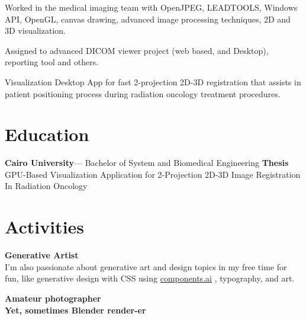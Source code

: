 \documentclass[]{deedy-resume-openfont}
\begin{document}
\begin{minipage}[t]{0.63\textwidth}
\subsectionsep{}
\begin{tightemize}
\item Worked in the medical imaging team with OpenJPEG, LEADTOOLS, Windows API, OpenGL, canvas drawing, advanced image processing techniques, 2D and 3D visualization.
\item Assigned to advanced DICOM viewer project (web based, and Desktop), reporting tool and others.
\end{tightemize}
\sectionsep
\vspace{4pt}

\subsectionsep{}
\begin{tightemize}
\item Visualization Desktop App for fast 2-projection 2D-3D registration that assists in patient positioning process during radiation oncology treatment procedures.
\end{tightemize}
\sectionsep


\section{Education}
\subsectionsep{}
\textbf{Cairo University}— Bachelor of System and Biomedical Engineering
\subsectionsep{}
\textbf{Thesis} GPU-Based Visualization Application for 2-Projection 2D-3D Image Registration In Radiation Oncology
\sectionsep

\section{Activities}
\subsectionsep{}
\textbf{Generative Artist} \\
I'm also passionate about generative art and design topics in my free time for fun, like generative design with CSS using \href{https://components.ai/}{components.ai}
, typography, and art.
\sectionsep

\textbf{Amateur photographer}\\
\textbf{Yet, sometimes Blender render-er}
\sectionsep

%
%


\end{minipage}%
\end{document}
